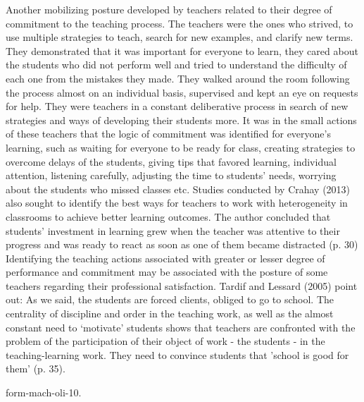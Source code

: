 \documentclass[11pt, a4paper]{article}
\begin{document}
Another mobilizing posture developed by teachers related to their degree of commitment to the teaching process. The
teachers were the ones who strived, to use multiple strategies to teach, search for new examples, and clarify new terms.
They demonstrated that it was important for everyone to learn, they cared about the students who did not perform well and
tried to understand the difficulty of each one from the mistakes they made. They walked around the room following the
process almost on an individual basis, supervised and kept an eye on requests for help. They were teachers in a constant
deliberative process in search of new strategies and ways of developing their students more. It was in the small actions of
these teachers that the logic of commitment was identified for everyone's learning, such as waiting for everyone to be
ready for class, creating strategies to overcome delays of the students, giving tips that favored learning, individual
attention, listening carefully, adjusting the time to students' needs, worrying about the students who missed classes etc.
Studies conducted by Crahay (2013) also sought to identify the best ways for teachers to work with heterogeneity in
classrooms to achieve better learning outcomes. The author concluded that students' investment in learning grew when
the teacher was attentive to their progress and was ready to react as soon as one of them became distracted (p. 30)
Identifying the teaching actions associated with greater or lesser degree of performance and commitment may be
associated with the posture of some teachers regarding their professional satisfaction. Tardif and Lessard (2005) point out:
As we said, the students are forced clients, obliged to go to school. The centrality of discipline and order in the teaching
work, as well as the almost constant need to `motivate' students shows that teachers are confronted with the problem of the
participation of their object of work - the students - in the teaching-learning work. They need to convince students that
'school is good for them' (p. 35).

\begin{thebibliography}{999}
     form-mach-oli-10.
\end{thebibliography}
\end{document}
